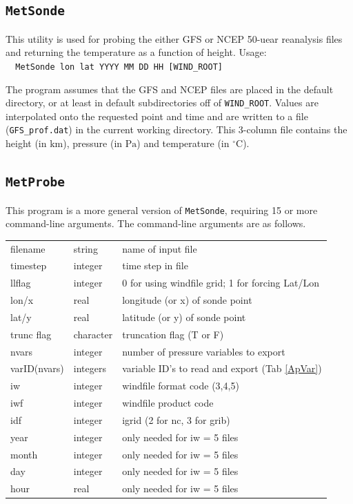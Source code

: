 \documentclass[11pt]{article}   %
\begin{document}
\subsection{\texttt{MetSonde}}
This utility is used for probing the either GFS or NCEP 50-uear reanalysis files and
returning the temperature as a function of height.  
Usage:\\
\verb|  MetSonde lon lat YYYY MM DD HH [WIND_ROOT]|

The program assumes that the GFS and NCEP files are placed in the default directory, or
at least in default subdirectories off of \texttt{WIND\_ROOT}.  Values are interpolated
onto the requested point and time and are written to a file (\texttt{GFS\_prof.dat}) in
the current working directory.  This 3-column file contains the height (in $\mathrm{km}$),
pressure (in $\mathrm{Pa}$) and temperature (in $^{\circ}\mathrm{C}$).

\subsection{\texttt{MetProbe}}
This program is a more general version of \texttt{MetSonde}, requiring 15 or more command-line
arguments.  The command-line arguments are as follows.
\\
\begin{tabular}{ l  l  l }
filename      & string    & name of input file \\
timestep      & integer   & time step in file \\
llflag        & integer   & 0 for using windfile grid; 1 for forcing Lat/Lon \\
lon/x         & real      & longitude (or x) of sonde point \\
lat/y         & real      & latitude (or y) of sonde point \\
trunc flag    & character & truncation flag (T or F) \\
nvars         & integer   & number of pressure variables to export \\
varID(nvars)  & integers  & variable ID's to read and export (Tab \ref{ApVar}) \\
iw            & integer   & windfile format code (3,4,5) \\
iwf           & integer   & windfile product code \\
idf           & integer   & igrid (2 for nc, 3 for grib) \\
year          & integer   & only needed for iw = 5 files \\
month         & integer   & only needed for iw = 5 files \\
day           & integer   & only needed for iw = 5 files \\
hour          & real      & only needed for iw = 5 files \\
\end{tabular}
\end{document}
